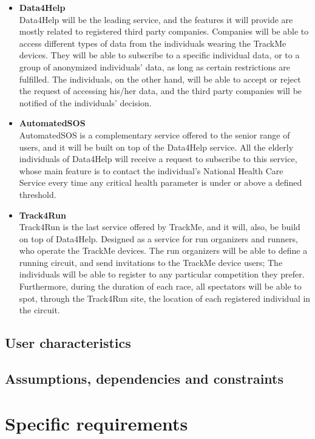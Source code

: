 \documentclass[12pt]{article}
\begin{document}
\begin{itemize}
\item{\textbf{Data4Help}}
\\Data4Help will be the leading service, and the features it will provide are mostly related to registered third party companies. Companies will be able to access different types of data from the individuals wearing the TrackMe devices. They will be able to subscribe to a specific individual data, or to a group of anonymized individuals' data, as long as certain restrictions are fulfilled. The individuals, on the other hand, will be able to accept or reject the request of accessing his/her data, and the third party companies will be notified of the individuals' decision.

\item{\textbf{AutomatedSOS}}
\\ AutomatedSOS is a complementary service offered to the senior range of users, and it will be built on top of the Data4Help service. All the elderly individuals of Data4Help will receive a request to subscribe to this service, whose main feature is to contact the individual's National Health Care Service every time any critical health parameter is under or above a defined threshold. 
\item{\textbf{Track4Run}}
\\Track4Run is the last service offered by TrackMe, and it will, also, be build on top of Data4Help. Designed as a service for run organizers and runners, who operate the TrackMe devices. The run organizers will be able to define a running circuit, and send invitations to the TrackMe device users; The individuals will be able to register to any particular competition they prefer. Furthermore, during the duration of each race, all spectators will be able to spot, through the Track4Run site, the location of each registered individual in the circuit.
\end{itemize}

\subsection{User characteristics}

\subsection{Assumptions, dependencies and constraints}

\section{Specific requirements}
\end{document}
